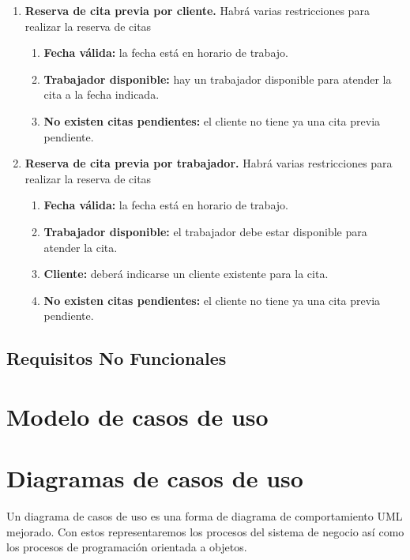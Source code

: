 \begin{enumerate}[leftmargin=1.75cm,start=1,label={\bfseries RS-\arabic*.}]
    \item \textbf{Reserva de cita previa por cliente.} Habrá varias restricciones para realizar la reserva de citas
    \begin{enumerate}[start=1,label={\bfseries RS-4.\arabic*.}]
        \item \textbf{Fecha válida:} la fecha está en horario de trabajo.
        \item \textbf{Trabajador disponible:} hay un trabajador disponible para atender la cita a la fecha indicada.
        \item \textbf{No existen citas pendientes:} el cliente no tiene ya una cita previa pendiente.
    \end{enumerate}

    \item \textbf{Reserva de cita previa por trabajador.} Habrá varias restricciones para realizar la reserva de citas
    \begin{enumerate}[start=1,label={\bfseries RS-4.\arabic*.}]
        \item \textbf{Fecha válida:} la fecha está en horario de trabajo.
        \item \textbf{Trabajador disponible:} el trabajador debe estar disponible para atender la cita.
        \item \textbf{Cliente:} deberá indicarse un cliente existente para la cita.
        \item \textbf{No existen citas pendientes:} el cliente no tiene ya una cita previa pendiente.
    \end{enumerate}
\end{enumerate}

\subsection{Requisitos No Funcionales}

\section{Modelo de casos de uso}

\section{Diagramas de casos de uso}

Un diagrama de casos de uso es una forma de diagrama de comportamiento UML mejorado. Con estos representaremos
los procesos del sistema de negocio así como los procesos de programación orientada a objetos.\\

